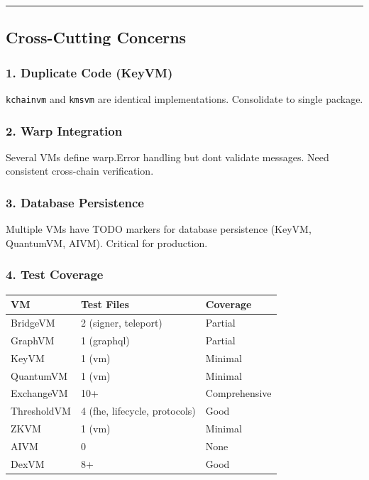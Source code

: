 \documentclass[
]{article}
\newcounter{none} %
\begin{document}
\begin{center}\rule{0.5\linewidth}{0.5pt}\end{center}

\subsection{Cross-Cutting Concerns}\label{cross-cutting-concerns}

\subsubsection{1. Duplicate Code (KeyVM)}\label{1-duplicate-code-keyvm}

\texttt{kchainvm} and \texttt{kmsvm} are identical implementations.
Consolidate to single package.

\subsubsection{2. Warp Integration}\label{2-warp-integration}

Several VMs define warp.Error handling but don\textquotesingle t
validate messages. Need consistent cross-chain verification.

\subsubsection{3. Database Persistence}\label{3-database-persistence}

Multiple VMs have TODO markers for database persistence (KeyVM,
QuantumVM, AIVM). Critical for production.

\subsubsection{4. Test Coverage}\label{4-test-coverage}

{\def\LTcaptype{none} %
\begin{longtable}[]{@{}lll@{}}
\toprule\noalign{}
VM & Test Files & Coverage \\
\midrule\noalign{}
\endhead
\bottomrule\noalign{}
\endlastfoot
BridgeVM & 2 (signer, teleport) & Partial \\
GraphVM & 1 (graphql) & Partial \\
KeyVM & 1 (vm) & Minimal \\
QuantumVM & 1 (vm) & Minimal \\
ExchangeVM & 10+ & Comprehensive \\
ThresholdVM & 4 (fhe, lifecycle, protocols) & Good \\
ZKVM & 1 (vm) & Minimal \\
AIVM & 0 & None \\
DexVM & 8+ & Good \\
\end{longtable}
}
\end{document}

